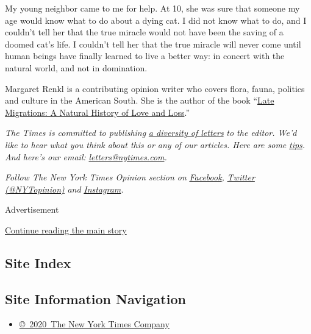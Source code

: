 My young neighbor came to me for help. At 10, she was sure that someone
my age would know what to do about a dying cat. I did not know what to
do, and I couldn't tell her that the true miracle would not have been
the saving of a doomed cat's life. I couldn't tell her that the true
miracle will never come until human beings have finally learned to live
a better way: in concert with the natural world, and not in domination.

Margaret Renkl is a contributing opinion writer who covers flora, fauna,
politics and culture in the American South. She is the author of the
book ``\href{https://milkweed.org/book/late-migrations}{Late Migrations:
A Natural History of Love and Loss}.''

\emph{The Times is committed to publishing}
\href{https://www.nytimes.com/2019/01/31/opinion/letters/letters-to-editor-new-york-times-women.html}{\emph{a
diversity of letters}} \emph{to the editor. We'd like to hear what you
think about this or any of our articles. Here are some}
\href{https://help.nytimes.com/hc/en-us/articles/115014925288-How-to-submit-a-letter-to-the-editor}{\emph{tips}}\emph{.
And here's our email:}
\href{mailto:letters@nytimes.com}{\emph{letters@nytimes.com}}\emph{.}

\emph{Follow The New York Times Opinion section on}
\href{https://www.facebook.com/nytopinion}{\emph{Facebook}}\emph{,}
\href{http://twitter.com/NYTOpinion}{\emph{Twitter (@NYTopinion)}}
\emph{and}
\href{https://www.instagram.com/nytopinion/}{\emph{Instagram}}\emph{.}

Advertisement

\protect\hyperlink{after-bottom}{Continue reading the main story}

\hypertarget{site-index}{%
\subsection{Site Index}\label{site-index}}

\hypertarget{site-information-navigation}{%
\subsection{Site Information
Navigation}\label{site-information-navigation}}

\begin{itemize}
\tightlist
\item
  \href{https://help.nytimes.com/hc/en-us/articles/115014792127-Copyright-notice}{©~2020~The
  New York Times Company}
\end{itemize}


